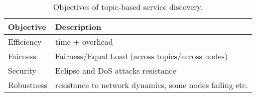 \begin{table} 
\caption{Objectives of topic-based service discovery.}
\label{tab:objectives}
\renewcommand{\arraystretch}{1.5}
\renewcommand{\tabcolsep}{0.5em}
\centering
\scriptsize{
\begin{tabular} {p{1cm}p{5cm}}
\toprule
\textbf{Objective} & \textbf{Description} \\
\hline
Efficiency & time + overhead \\
\hline
Fairness & Fairness/Equal Load (across topics/across nodes) \\
\hline
Security & Eclipse and DoS attacks resistance\\
\hline
Robustness & resistance to network dynamics, some nodes failing etc.\\
\hline
\end{tabular}
}
\vspace{-0.2in}
\end{table}




